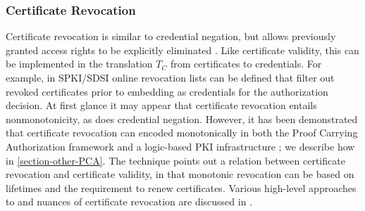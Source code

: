 \subsubsection{Certificate Revocation} Certificate revocation is 
similar to credential negation, but allows previously granted access
rights to be explicitly eliminated \cite{Rivest:CWECRL}.  Like
certificate validity, this can be implemented in the translation $T_C$
from certificates to credentials. For example, in SPKI/SDSI
\cite{RFC-2693} online revocation lists can be defined that filter out
revoked certificates prior to embedding as credentials for the
authorization decision.  At first glance it may appear that
certificate revocation entails nonmonotonicity, as does credential
negation.  However, it has been demonstrated that certificate
revocation can encoded monotonically in both the Proof Carrying
Authorization framework \cite{Bauer:GFACSW} and a logic-based PKI
infrastructure \cite{lbi-fc01}; we describe how in
\autoref{section-other-PCA}.  The technique points out a relation
between certificate revocation and certificate validity, in that
monotonic revocation can be based on lifetimes and the requirement to
renew certificates.  Various high-level approaches to and nuances of
certificate revocation are discussed in \cite{Rivest:CWECRL}.

%
%

